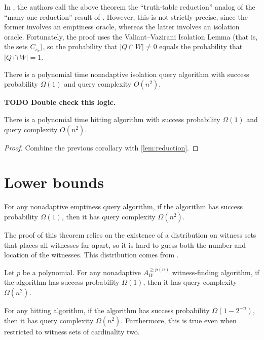 \documentclass{article}
\newcommand{\todo}[1]{\textbf{TODO #1}}
\begin{document}
In \autocite{krw12}, the authors call the above theorem the ``truth-table reduction'' analog of the ``many-one reduction'' result of \autocite[Theorem~4.2]{dkvmw13}.
However, this is not strictly precise, since the former involves an emptiness oracle, whereas the latter involves an isolation oracle.
Fortunately, the proof uses the Valiant--Vazirani Isolation Lemma (that is, the sets $C_{s_k}$), so the probability that $|Q \cap W| \neq 0$ equals the probability that $|Q \cap W| = 1$.

\begin{corollary}
  There is a polynomial time nonadaptive isolation query algorithm with success probability $\Omega(1)$ and query complexity $O(n^2)$.
\end{corollary}

\todo{Double check this logic.}

\begin{corollary}
  There is a polynomial time hitting algorithm with success probability $\Omega(1)$ and query complexity $O(n^2)$.
\end{corollary}
\begin{proof}
  Combine the previous corollary with \autoref{lem:reduction}.
\end{proof}

\section{Lower bounds}

\begin{theorem}\label{thm:nonadaptiveemptiness}
  For any nonadaptive emptiness query algorithm, if the algorithm has success probability $\Omega(1)$, then it has query complexity $\Omega(n^2)$.
\end{theorem}

The proof of this theorem relies on the existence of a distribution on witness sets that places all witnesses far apart, so it is hard to guess both the number and location of the witnesses.
This distribution comes from \autocite[Theorem~4.2]{dkvmw13}.

\begin{corollary}
  Let $p$ be a polynomial.
  For any nonadaptive $A^{\geq p(n)}_W$ witness-finding algorithm, if the algorithm has success probability $\Omega(1)$, then it has query complexity $\Omega(n^2)$.
\end{corollary}

\begin{theorem}
  For any hitting algorithm, if the algorithm has success probability $\Omega(1 - 2^{-n})$, then it has query complexity $\Omega(n^2)$.
  Furthermore, this is true even when restricted to witness sets of cardinality two.
\end{theorem}
\end{document}
